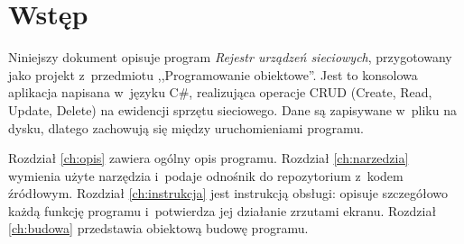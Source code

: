\chapter*{Wstęp}

Niniejszy dokument opisuje program \textit{Rejestr urządzeń sieciowych}, przygotowany jako projekt z~przedmiotu ,,Programowanie obiektowe''. Jest to konsolowa aplikacja napisana w~języku C\#, realizująca operacje CRUD (Create, Read, Update, Delete) na ewidencji sprzętu sieciowego. Dane są zapisywane w~pliku na dysku, dlatego zachowują się między uruchomieniami programu.

Rozdział \ref{ch:opis} zawiera ogólny opis programu. Rozdział \ref{ch:narzedzia} wymienia użyte narzędzia i~podaje odnośnik do repozytorium z~kodem źródłowym. Rozdział \ref{ch:instrukcja} jest instrukcją obsługi: opisuje szczegółowo każdą funkcję programu i~potwierdza jej działanie zrzutami ekranu. Rozdział \ref{ch:budowa} przedstawia obiektową budowę programu.
